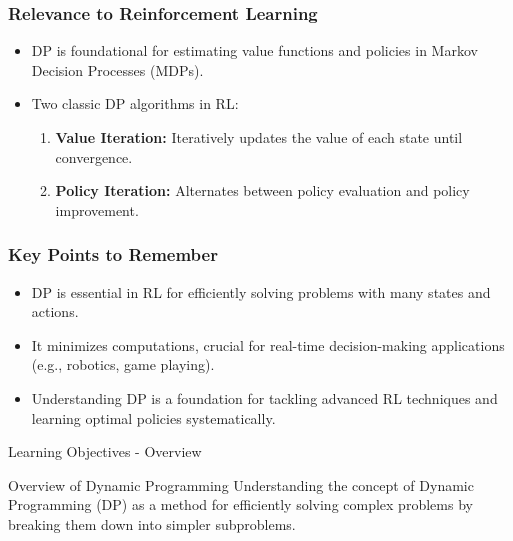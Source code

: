 \documentclass[aspectratio=169]{beamer}
\begin{document}
\begin{frame}
    \frametitle{Relevance to Reinforcement Learning}
    \begin{itemize}
        \item DP is foundational for estimating value functions and policies in Markov Decision Processes (MDPs).
        
        \item Two classic DP algorithms in RL:
            \begin{enumerate}
                \item \textbf{Value Iteration:} Iteratively updates the value of each state until convergence.
                \item \textbf{Policy Iteration:} Alternates between policy evaluation and policy improvement.
            \end{enumerate}
    \end{itemize}
\end{frame}

\begin{frame}
    \frametitle{Key Points to Remember}
    \begin{itemize}
        \item DP is essential in RL for efficiently solving problems with many states and actions.
        \item It minimizes computations, crucial for real-time decision-making applications (e.g., robotics, game playing).
        \item Understanding DP is a foundation for tackling advanced RL techniques and learning optimal policies systematically.
    \end{itemize}
\end{frame}

\begin{frame}[fragile]{Learning Objectives - Overview}
    \begin{block}{Overview of Dynamic Programming}
        Understanding the concept of Dynamic Programming (DP) as a method for efficiently solving complex problems by breaking them down into simpler subproblems.
    \end{block}
\end{frame}
\end{document}
